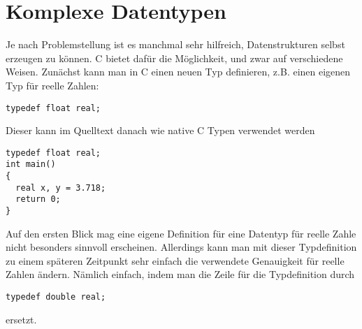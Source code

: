 \section{Komplexe Datentypen}

Je nach Problemstellung ist es manchmal sehr hilfreich, Datenstrukturen selbst erzeugen zu können.
C bietet dafür die Möglichkeit, und zwar auf verschiedene Weisen.
Zunächst kann man in C einen neuen Typ definieren, z.B. einen eigenen Typ für reelle Zahlen:
\begin{lstlisting}
typedef float real;
\end{lstlisting}
Dieser kann im Quelltext danach wie native C Typen verwendet werden
\begin{lstlisting}
typedef float real;
int main()
{
  real x, y = 3.718;
  return 0;
}
\end{lstlisting}
Auf den ersten Blick mag eine eigene Definition für eine Datentyp für reelle Zahle nicht besonders sinnvoll erscheinen.
Allerdings kann man mit dieser Typdefinition zu einem späteren Zeitpunkt sehr einfach die verwendete Genauigkeit für reelle Zahlen ändern.
Nämlich einfach, indem man die Zeile für die Typdefinition durch
\begin{lstlisting}
typedef double real;
\end{lstlisting}
ersetzt.

